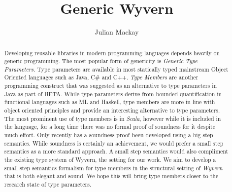 \documentclass[11pt
              , a4paper
              , twoside
              , openright
              ]{report}
\title{Generic Wyvern}
\author{Julian Mackay}
\date{}
\numberwithin{case}{theorem}
\numberwithin{subcase}{case}
\begin{document}
\frontmatter



\begin{abstract}
Developing reusable libraries in modern programming languages depends heavily on generic programming. The most popular form of genericity is \emph{Generic Type Parameters}. Type parameters are available in most statically typed mainstream Object Oriented languages such as Java, C\# and C++. \emph{Type Members} are another programming construct that was suggested as an alternative to type parameters in Java as part of BETA. While type parameters derive from bounded quantification in functional languages such as ML and Haskell, type members are more in line with object oriented principles and provide an interesting alternative to type parameters. The most prominent use of type members is in \emph{Scala}, however while it is included in the language, for a long time there was no formal proof of soundness for it despite much effort. Only recently has a soundness proof been developed using a big step semantics. While soundness is certainly an achievement, we would prefer a small step semantics as a more standard approach. A small step semantics would also compliment the existing type system of Wyvern, the setting for our work. We aim to develop a small step semantics formalism for type members in the structural setting of \emph{Wyvern} that is both elegant and sound. We hope this will bring type members closer to the research state of type parameters. 
\end{abstract}


\maketitle



\tableofcontents



\mainmatter

\end{document}
